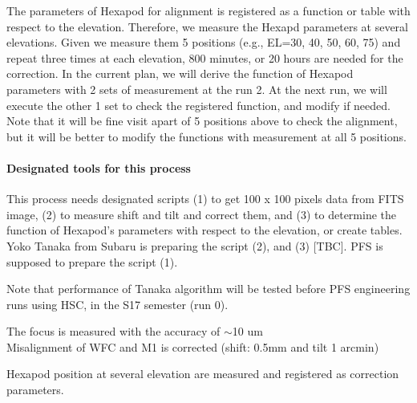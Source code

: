 The parameters of Hexapod for alignment is registered as a function or table with respect to the elevation.
Therefore, we measure the Hexapd parameters at several elevations.
Given we measure them 5 positions (e.g., EL=30, 40, 50, 60, 75) and repeat three times at each elevation, 800 minutes, or 20 hours are needed for the correction.
In the current plan, we will derive the function of Hexapod parameters with 2 sets of measurement at the run 2.
At the next run, we will execute the other 1 set to check the registered function, and modify if needed.
Note that it will be fine visit apart of 5 positions above to check the alignment, but it will be better to modify the functions with measurement at all 5 positions.

\smallskip
\paragraph{Designated tools for this process}
This process needs designated scripts
(1) to get 100 x 100 pixels data from FITS image,
(2) to measure shift and tilt and correct them, and
(3) to determine the function of Hexapod's parameters with respect to the elevation, or create tables. 
Yoko Tanaka from Subaru is preparing the script (2), and (3) [TBC].
PFS is supposed to prepare the script (1).

Note that performance of Tanaka algorithm will be tested before PFS engineering runs using HSC, in the S17 semester (run 0).

\begin{itembox}[l]{}
The focus is measured with the accuracy of $\sim$10 um \\
Misalignment of  WFC and M1 is corrected (shift: 0.5mm and tilt 1 arcmin)

Hexapod position at several elevation are measured and registered as correction parameters.

\end{itembox}